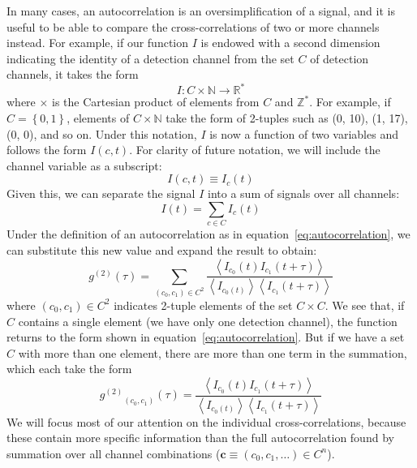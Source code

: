 \documentclass{article}
\newcommand{\braces}[1]{\ensuremath{\left\lbrace #1 \right\rbrace}}
\newcommand{\angles}[1]{\ensuremath{\left\langle #1 \right\rangle}}
\newcommand{\gn}[1]{\ensuremath{g^{(#1)}}}
\newcommand{\integers}{\ensuremath{\mathbb{Z}}}
\newcommand{\wholes}{\ensuremath{\mathbb{N}}}
\newcommand{\reals}{\ensuremath{\mathbb{R}}}
\renewcommand{\vec}{\mathbf}
\begin{document}
In many cases, an autocorrelation is an oversimplification of a signal, and it is useful to be able to compare the cross-correlations of two or more channels instead. For example, if our function $I$ is endowed with a second dimension indicating the identity of a detection channel from the set $C$ of detection channels, it takes the form
\begin{equation}
I:C\times\wholes\rightarrow\reals^{*}
\end{equation}
where $\times$ is the Cartesian product of elements from $C$ and $\integers^{*}$. For example, if $C=\braces{0, 1}$, elements of $C\times\wholes$ take the form of 2-tuples such as (0, 10), (1, 17), (0, 0), and so on. Under this notation, $I$ is now a function of two variables and follows the form $I(c, t)$. For clarity of future notation, we will include the channel variable as a subscript:
\begin{equation}
I(c,t)\equiv I_{c}(t)
\end{equation}
Given this, we can separate the signal $I$ into a sum of signals over all channels:
\begin{equation}
I(t) = \sum_{c\in C}{I_{c}(t)}
\end{equation}
Under the definition of an autocorrelation as in equation~\ref{eq:autocorrelation}, we can substitute this new value and expand the result to obtain:
\begin{equation}
\gn{2}(\tau)=\sum_{(c_{0},c_{1})\in C^{2}}{\frac{\angles{I_{c_{0}}(t)I_{c_{1}}(t+\tau)}}
                                                {\angles{I_{c_{0}(t)}}\angles{I_{c_{1}}(t+\tau)}}}
\end{equation}
where $(c_{0},c_{1})\in C^{2}$ indicates 2-tuple elements of the set $C\times C$. We see that, if $C$ contains a single element (we have only one detection channel), the function returns to the form shown in equation~\ref{eq:autocorrelation}. But if we have a set $C$ with more than one element, there are more than one term in the summation, which each take the form
\begin{equation}
\gn{2}_{(c_{0},c_{1})}(\tau)=\frac{\angles{I_{c_{0}}(t)I_{c_{1}}(t+\tau)}}
                                                {\angles{I_{c_{0}(t)}}\angles{I_{c_{1}}(t+\tau)}}
\end{equation}
We will focus most of our attention on the individual cross-correlations, because these contain more specific information than the full autocorrelation found by summation over all channel combinations ($\vec{c}\equiv (c_{0}, c_{1},\ldots)\in C^{n}$). 
\end{document}
